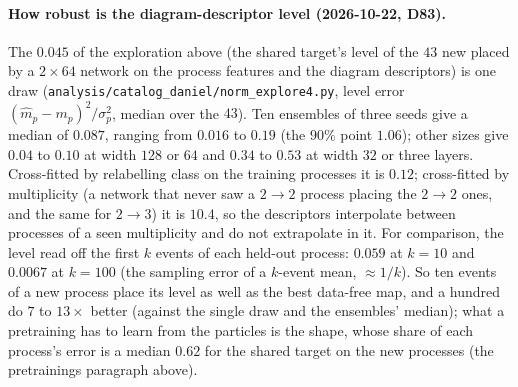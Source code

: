 \documentclass[11pt]{article}
\newcommand{\code}[1]{\texttt{#1}}
\begin{document}
\paragraph{How robust is the diagram-descriptor level (2026-10-22, D83).} The $0.045$ of the exploration above (the shared target's level
of the $43$ new placed by a $2\times64$ network on the process features and the diagram descriptors) is one draw
(\code{analysis/catalog\_daniel/norm\_explore4.py}, level error $(\hat m_p-m_p)^2/\sigma_p^2$, median over the $43$).
Ten ensembles of three seeds give a median of $0.087$, ranging from $0.016$ to $0.19$ (the $90\%$ point $1.06$); other
sizes give $0.04$ to $0.10$ at width $128$ or $64$ and $0.34$ to $0.53$ at width $32$ or three layers. Cross-fitted by
relabelling class on the training processes it is $0.12$; cross-fitted by multiplicity (a network that never saw a
$2\to2$ process placing the $2\to2$ ones, and the same for $2\to3$) it is $10.4$, so the descriptors interpolate between
processes of a seen multiplicity and do not extrapolate in it. For comparison, the level read off the first $k$ events
of each held-out process: $0.059$ at $k=10$ and $0.0067$ at $k=100$ (the sampling error of a $k$-event mean, $\approx1/k$).
So ten events of a new process place its level as well as the best data-free map, and a hundred do $7$ to $13\times$
better (against the single draw and the ensembles' median); what a pretraining has to learn from the particles is the
shape, whose share of each process's error is a median $0.62$ for the shared target on the new processes (the pretrainings paragraph above).
\end{document}
